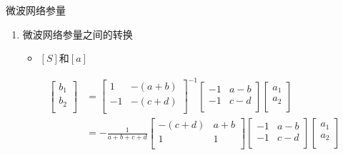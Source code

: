 \begin{frame}{微波网络参量}
    \begin{enumerate}
        \resume
        \item 微波网络参量之间的转换
              \begin{itemize}
                  \item $[S]$和$[a]$
              \end{itemize}
              \begin{align*}
                  \begin{bmatrix*}
                      b_1 \\
                      b_2 \\
                  \end{bmatrix*}
                   & =
                  \begin{bmatrix*}
                      1 & -(a+b) \\
                      -1 & -(c+d) \\
                  \end{bmatrix*}^{-1}
                  \begin{bmatrix*}
                      -1 & a-b \\
                      -1 & c-d \\
                  \end{bmatrix*}
                  \begin{bmatrix*}
                      a_1 \\
                      a_2 \\
                  \end{bmatrix*} \\
                   & =
                  -\frac{1}{a+b+c+d}
                  \begin{bmatrix*}
                      -(c+d) & a+b \\
                      1 & 1 \\
                  \end{bmatrix*}
                  \begin{bmatrix*}
                      -1 & a-b \\
                      -1 & c-d \\
                  \end{bmatrix*}
                  \begin{bmatrix*}
                      a_1 \\
                      a_2 \\

\end{bmatrix*}
\end{align*}
\end{enumerate}
\end{frame}
